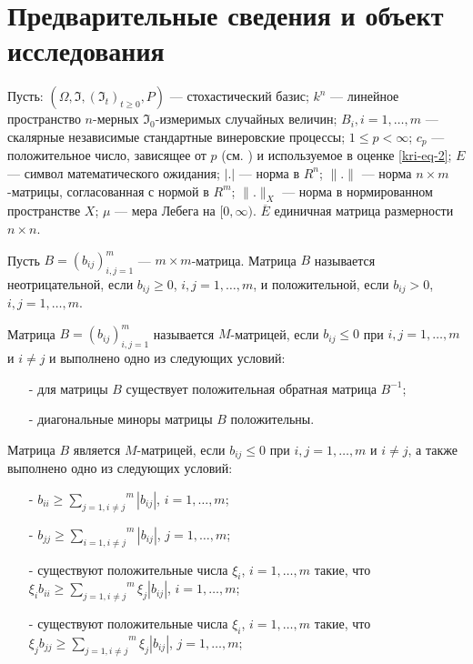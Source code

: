 \section{Предварительные сведения и объект исследования}

Пусть:  $(\Omega, \Im, (\Im_t)_{t \ge 0}, P)$ --- стохастический базис;  $k^n$ --- линейное пространство  $n$-мерных $\Im_0$-измеримых случайных величин;  $B_i, i=1, \dots, m$ --- скалярные независимые стандартные винеровские процессы; $1 \le p < \infty$;  $c_p$ --- положительное число, зависящее от $p$ (см. \cite[с. 65]{kri-bib-17}) и используемое в оценке \eqref{kri-eq-2}; $E$ --- символ математического ожидания; $|.|$ --- норма в $R^n$; $\|.\|$ --- норма $n \times m$-матрицы, согласованная с нормой в $R^m$; $\|.\|_X$ --- норма в нормированном пространстве  $X$; $\mu$ --- мера Лебега на $[0, \infty )$.
$\overline E$ единичная матрица размерности  $n\times n$.

Пусть $B=(b_{ij})_{i,j=1}^m$ --- $m\times m$-матрица.
Матрица  $B$ называется неотрицательной, если  $b_{ij} \ge 0$, $i,j=1, \dots ,m$, и положительной, если $b_{ij} > 0$, $i, j=1, \dots, m$.

\begin{definition}
\cite{kri-bib-18} Матрица  $B=(b_{ij})_{i,j=1}^m$ называется $M$-матрицей, если $b_{ij}\le 0$ при  $i,j=1,\dots,m$ и $i\neq j$ и выполнено одно из следующих условий:

\begin{itemize}
	\item[-]
	для матрицы  $B$ существует положительная обратная матрица $B^{-1}$;
	
	\item[-]
	диагональные миноры матрицы  $B$ положительны.
\end{itemize}
\end{definition}

\begin{lemma}
\cite{kri-bib-18} Матрица $B$ является $M$-матрицей, если $b_{ij}\le 0$ при $i,j=1,\dots,m$ и $i\neq j$, а также выполнено одно из следующих условий:

\begin{itemize}
	\item[-]
	$b_{ii}\ge \overset m{\underset{j=1,i\neq j}{\sum }}|b_{ij}|$, $i=1,\dots,m$;
	
	\item[-]
	$b_{jj}\ge \overset m{\underset{i=1,i\neq j}{\sum }}|b_{ij}|$, $j=1,\dots,m$;
	
	\item[-]
	существуют положительные числа $\xi_i$, $i=1,\dots,m$ такие, что \\ $\xi_ib_{ii}\ge \overset m{\underset{j=1,i\neq j}{\sum}}\xi_j|b_{ij}|$, $i=1,\dots,m$;
	
	\item[-]
	существуют положительные числа $\xi_i$, $i=1,\dots,m$ такие, что \\ $\xi_jb_{jj}\ge \overset m{\underset{j=1,i\neq j}{\sum}}\xi_j|b_{ij}|$, $j=1,\dots,m$;
\end{itemize}
\end{lemma}

